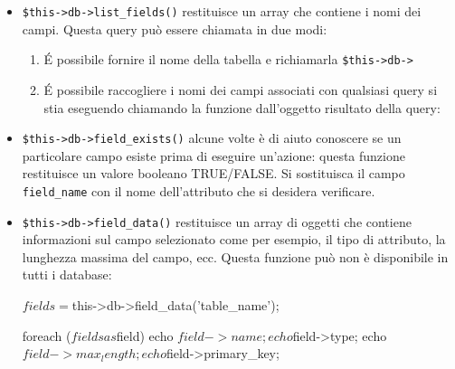 \begin{itemize}
\item \verb|$this->db->list_fields()| restituisce un array che contiene i nomi dei campi. Questa query può essere chiamata in due modi:

\begin{enumerate}
\item \'E possibile fornire il nome della tabella e richiamarla \verb|$this->db->|


\item \'E possibile raccogliere i nomi dei campi associati con qualsiasi query si stia eseguendo chiamando la funzione dall'oggetto risultato della query:

\end{enumerate}

\item \verb|$this->db->field_exists()| alcune volte è di aiuto conoscere se un particolare campo esiste prima di eseguire un'azione: questa funzione restituisce un valore booleano TRUE/FALSE. Si sostituisca il campo \verb|field_name| con il nome dell'attributo che si desidera verificare.


\item \verb|$this->db->field_data()| restituisce un array di oggetti che contiene informazioni sul campo selezionato come per esempio, il tipo di attributo, la lunghezza massima del campo, ecc. Questa funzione può non è disponibile in tutti i database:

\begin{code}
$fields = $this->db->field_data('table_name');

foreach ($fields as $field)
{
   echo $field->name;
   echo $field->type;
   echo $field->max_length;
   echo $field->primary_key;
}
\end{code}


\end{itemize}
